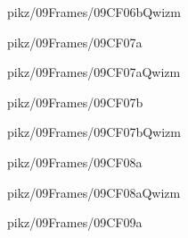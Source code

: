 \documentclass[9pt,xcolor={svgnames, x11names}]{beamer}
\begin{document}

\begin{frame}{pikz/09Frames/09CF06bQwizm}
	
\end{frame}


\begin{frame}{pikz/09Frames/09CF07a}
	
\end{frame}


\begin{frame}{pikz/09Frames/09CF07aQwizm}
	
\end{frame}


\begin{frame}{pikz/09Frames/09CF07b}
	
\end{frame}


\begin{frame}{pikz/09Frames/09CF07bQwizm}
	
\end{frame}


\begin{frame}{pikz/09Frames/09CF08a}
	
\end{frame}


\begin{frame}{pikz/09Frames/09CF08aQwizm}
	
\end{frame}


\begin{frame}{pikz/09Frames/09CF09a}
	
\end{frame}
\end{document}
